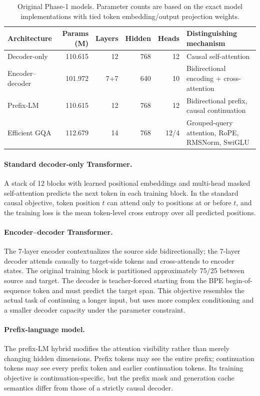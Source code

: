 \documentclass[11pt,a4paper]{article}
\begin{document}
\begin{table}[htbp]\centering\small
\caption{Original Phase-1 models. Parameter counts are based on the exact model implementations with tied token embedding/output projection weights.}
\label{tab:models}
\begin{tabular}{p{.27\linewidth}rrrr>{\raggedright\arraybackslash}p{.20\linewidth}}
\toprule
Architecture & Params (M) & Layers & Hidden & Heads & Distinguishing mechanism \\
\midrule
Decoder-only & 110.615 & 12 & 768 & 12 & Causal self-attention \\
Encoder--decoder & 101.972 & 7+7 & 640 & 10 & Bidirectional encoding + cross-attention \\
Prefix-LM & 110.615 & 12 & 768 & 12 & Bidirectional prefix, causal continuation \\
Efficient GQA & 112.679 & 14 & 768 & 12/4 & Grouped-query attention, RoPE, RMSNorm, SwiGLU \\
\bottomrule
\end{tabular}
\end{table}

\paragraph{Standard decoder-only Transformer.} A stack of 12 blocks with learned positional embeddings and multi-head masked self-attention predicts the next token in each training block. In the standard causal objective, token position \(t\) can attend only to positions at or before \(t\), and the training loss is the mean token-level cross entropy over all predicted positions.

\paragraph{Encoder--decoder Transformer.} The 7-layer encoder contextualizes the source side bidirectionally; the 7-layer decoder attends causally to target-side tokens and cross-attends to encoder states. The original training block is partitioned approximately 75/25 between source and target. The decoder is teacher-forced starting from the BPE begin-of-sequence token and must predict the target span. This objective resembles the actual task of continuing a longer input, but uses more complex conditioning and a smaller decoder capacity under the parameter constraint.

\paragraph{Prefix-language model.} The prefix-LM hybrid modifies the attention visibility rather than merely changing hidden dimensions. Prefix tokens may see the entire prefix; continuation tokens may see every prefix token and earlier continuation tokens. Its training objective is continuation-specific, but the prefix mask and generation cache semantics differ from those of a strictly causal decoder.
\end{document}
